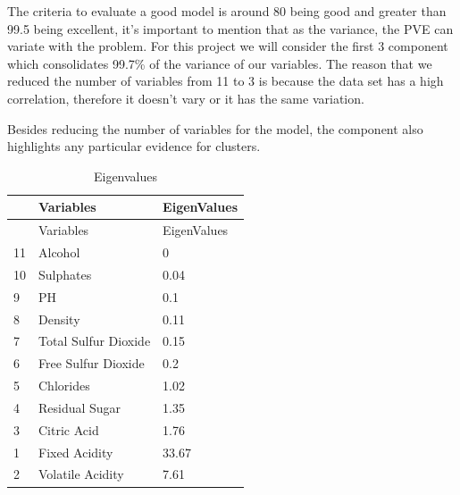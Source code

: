 \documentclass[]{article}
\newenvironment{Shaded}{\begin{snugshade}}{\end{snugshade}}
\newcommand{\KeywordTok}[1]{\textcolor[rgb]{0.13,0.29,0.53}{\textbf{{#1}}}}
\newcommand{\DataTypeTok}[1]{\textcolor[rgb]{0.13,0.29,0.53}{{#1}}}
\newcommand{\DecValTok}[1]{\textcolor[rgb]{0.00,0.00,0.81}{{#1}}}
\newcommand{\StringTok}[1]{\textcolor[rgb]{0.31,0.60,0.02}{{#1}}}
\newcommand{\NormalTok}[1]{{#1}}
\begin{document}
The criteria to evaluate a good model is around 80 being good and
greater than 99.5 being excellent, it's important to mention that as the
variance, the PVE can variate with the problem. For this project we will
consider the first 3 component which consolidates 99.7\% of the variance
of our variables. The reason that we reduced the number of variables
from 11 to 3 is because the data set has a high correlation, therefore
it doesn't vary or it has the same variation.

Besides reducing the number of variables for the model, the component
also highlights any particular evidence for clusters.

\begin{Shaded}
\end{Shaded}

\begin{longtable}[c]{@{}lll@{}}
\caption{Eigenvalues}\tabularnewline
\toprule
& Variables & EigenValues\tabularnewline
\midrule
\endfirsthead
\toprule
& Variables & EigenValues\tabularnewline
\midrule
\endhead
11 & Alcohol & 0\tabularnewline
10 & Sulphates & 0.04\tabularnewline
9 & PH & 0.1\tabularnewline
8 & Density & 0.11\tabularnewline
7 & Total Sulfur Dioxide & 0.15\tabularnewline
6 & Free Sulfur Dioxide & 0.2\tabularnewline
5 & Chlorides & 1.02\tabularnewline
4 & Residual Sugar & 1.35\tabularnewline
3 & Citric Acid & 1.76\tabularnewline
1 & Fixed Acidity & 33.67\tabularnewline
2 & Volatile Acidity & 7.61\tabularnewline
\bottomrule
\end{longtable}
\end{document}
